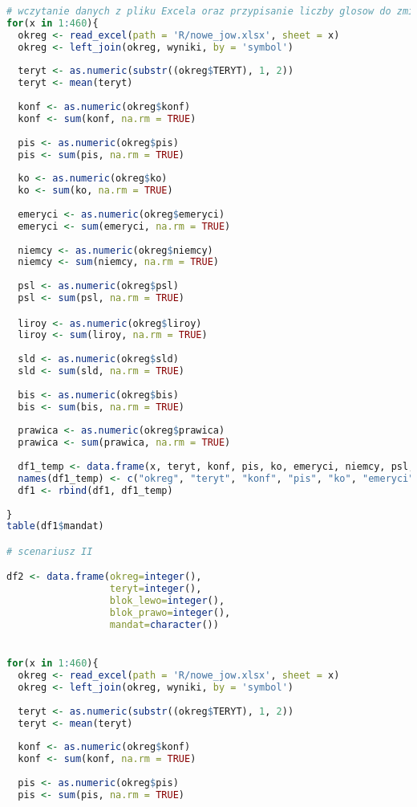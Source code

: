 \documentclass[12pt, a4paper, fleqn]{report}
\begin{document}
\begin{lstlisting}[language=R]
# wczytanie danych z pliku Excela oraz przypisanie liczby glosow do zmiennych
for(x in 1:460){
  okreg <- read_excel(path = 'R/nowe_jow.xlsx', sheet = x)
  okreg <- left_join(okreg, wyniki, by = 'symbol')
  
  teryt <- as.numeric(substr((okreg$TERYT), 1, 2))
  teryt <- mean(teryt)
  
  konf <- as.numeric(okreg$konf)
  konf <- sum(konf, na.rm = TRUE)
  
  pis <- as.numeric(okreg$pis)
  pis <- sum(pis, na.rm = TRUE)
  
  ko <- as.numeric(okreg$ko)
  ko <- sum(ko, na.rm = TRUE)
  
  emeryci <- as.numeric(okreg$emeryci)
  emeryci <- sum(emeryci, na.rm = TRUE)
  
  niemcy <- as.numeric(okreg$niemcy)
  niemcy <- sum(niemcy, na.rm = TRUE)
  
  psl <- as.numeric(okreg$psl)
  psl <- sum(psl, na.rm = TRUE)

  liroy <- as.numeric(okreg$liroy)
  liroy <- sum(liroy, na.rm = TRUE)
  
  sld <- as.numeric(okreg$sld)
  sld <- sum(sld, na.rm = TRUE)
  
  bis <- as.numeric(okreg$bis)
  bis <- sum(bis, na.rm = TRUE)
  
  prawica <- as.numeric(okreg$prawica)
  prawica <- sum(prawica, na.rm = TRUE)
  
  df1_temp <- data.frame(x, teryt, konf, pis, ko, emeryci, niemcy, psl, liroy, sld, bis, prawica, mandat1())
  names(df1_temp) <- c("okreg", "teryt", "konf", "pis", "ko", "emeryci", "niemcy", "psl", "liroy", "sld", "bis", "prawica", "mandat")
  df1 <- rbind(df1, df1_temp)
  
}
table(df1$mandat)

# scenariusz II

df2 <- data.frame(okreg=integer(),
                  teryt=integer(),
                  blok_lewo=integer(),
                  blok_prawo=integer(),
                  mandat=character())


for(x in 1:460){
  okreg <- read_excel(path = 'R/nowe_jow.xlsx', sheet = x)
  okreg <- left_join(okreg, wyniki, by = 'symbol')
  
  teryt <- as.numeric(substr((okreg$TERYT), 1, 2))
  teryt <- mean(teryt)
  
  konf <- as.numeric(okreg$konf)
  konf <- sum(konf, na.rm = TRUE)
  
  pis <- as.numeric(okreg$pis)
  pis <- sum(pis, na.rm = TRUE)
  

\end{lstlisting}
\end{document}
